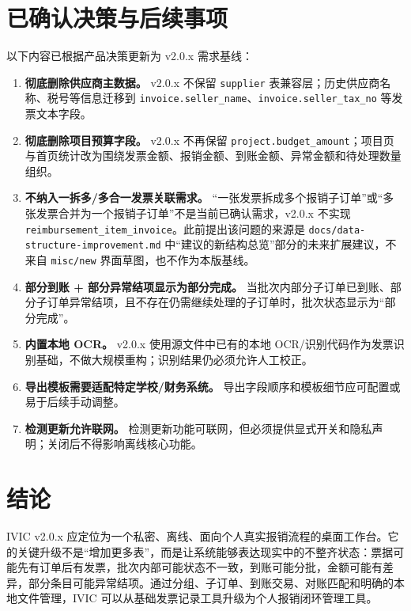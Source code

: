 \documentclass[UTF8,zihao=-4]{ctexart}
\begin{document}
\section{已确认决策与后续事项}

以下内容已根据产品决策更新为 v2.0.x 需求基线：

\begin{enumerate}
  \item \textbf{彻底删除供应商主数据。} v2.0.x 不保留 \texttt{supplier} 表兼容层；历史供应商名称、税号等信息迁移到 \texttt{invoice.seller\_name}、\texttt{invoice.seller\_tax\_no} 等发票文本字段。
  \item \textbf{彻底删除项目预算字段。} v2.0.x 不再保留 \texttt{project.budget\_amount}；项目页与首页统计改为围绕发票金额、报销金额、到账金额、异常金额和待处理数量组织。
  \item \textbf{不纳入一拆多/多合一发票关联需求。} “一张发票拆成多个报销子订单”或“多张发票合并为一个报销子订单”不是当前已确认需求，v2.0.x 不实现 \texttt{reimbursement\_item\_invoice}。此前提出该问题的来源是 \texttt{docs/data-structure-improvement.md} 中“建议的新结构总览”部分的未来扩展建议，不来自 \texttt{misc/new} 界面草图，也不作为本版基线。
  \item \textbf{部分到账 + 部分异常结项显示为部分完成。} 当批次内部分子订单已到账、部分子订单异常结项，且不存在仍需继续处理的子订单时，批次状态显示为“部分完成”。
  \item \textbf{内置本地 OCR。} v2.0.x 使用源文件中已有的本地 OCR/识别代码作为发票识别基础，不做大规模重构；识别结果仍必须允许人工校正。
  \item \textbf{导出模板需要适配特定学校/财务系统。} 导出字段顺序和模板细节应可配置或易于后续手动调整。
  \item \textbf{检测更新允许联网。} 检测更新功能可联网，但必须提供显式开关和隐私声明；关闭后不得影响离线核心功能。
\end{enumerate}

\section{结论}

IVIC v2.0.x 应定位为一个私密、离线、面向个人真实报销流程的桌面工作台。它的关键升级不是“增加更多表”，而是让系统能够表达现实中的不整齐状态：票据可能先有订单后有发票，批次内部可能状态不一致，到账可能分批，金额可能有差异，部分条目可能异常结项。通过分组、子订单、到账交易、对账匹配和明确的本地文件管理，IVIC 可以从基础发票记录工具升级为个人报销闭环管理工具。
\end{document}
